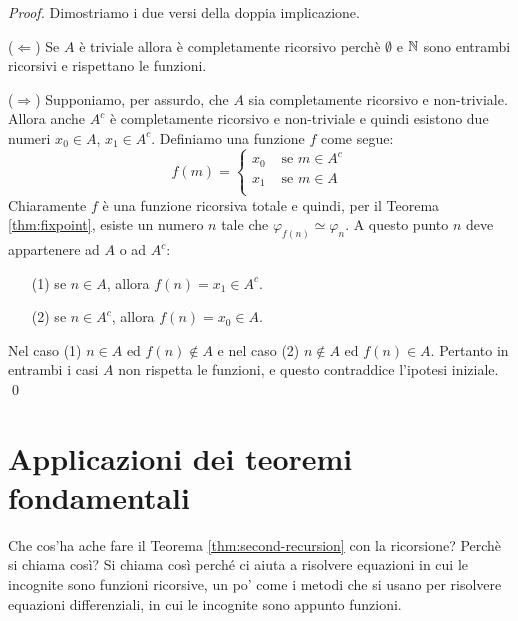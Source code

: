 \documentclass[runningheads,a4paper]{llncs}
\begin{document}
\begin{proof}
Dimostriamo i due versi della doppia implicazione.

\noindent($\Leftarrow$) Se $A$ \`{e} triviale allora \`{e} completamente ricorsivo perch\`{e} $\emptyset$ e $\mathbb{N}$ sono entrambi ricorsivi
 e rispettano le funzioni.

\noindent($\Rightarrow$) Supponiamo, per assurdo, che $A$ sia completamente ricorsivo e non-triviale. Allora anche $A^c$ \`{e}
 completamente ricorsivo e non-triviale e quindi esistono due numeri $x_0 \in A$, $x_1 \in A^c$. Definiamo una funzione $f$ come segue:
$$
f(m) =
\begin{cases}
x_0	& \mbox{ se $m \in A^c$} \\ 
x_1	& \mbox{ se $m \in A$} \\
\end{cases}
$$
Chiaramente $f$ \`{e} una funzione ricorsiva totale e quindi, per il Teorema \ref{thm:fixpoint}, esiste un numero $n$ tale che
 $\varphi_{f(n)} \simeq \varphi_n$. A questo punto $n$ deve appartenere ad $A$ o ad $A^c$:
\begin{itemize}
\item[(1)] se $n \in A$, allora $f(n) = x_1 \in A^c$.
\item[(2)] se $n \in A^c$, allora $f(n) = x_0 \in A$.
\end{itemize}
Nel caso (1) $n \in A$ ed $f(n) \not\in A$ e nel caso (2) $n \not\in A$ ed $f(n) \in A$. Pertanto in entrambi i casi $A$ non
 rispetta le funzioni, e questo contraddice l'ipotesi iniziale.
\qed\end{proof}

\section{Applicazioni dei teoremi fondamentali}

Che cos'ha ache fare il Teorema \ref{thm:second-recursion} con la ricorsione? Perch\`{e} si chiama cos\`{i}?
 Si chiama cos\`{i} perch\'{e} ci aiuta a risolvere equazioni in cui le incognite sono funzioni ricorsive, un po' come 
 i metodi che si usano per risolvere equazioni differenziali, in cui le incognite sono appunto funzioni.
\end{document}
